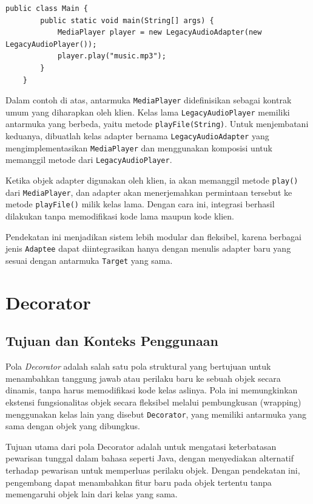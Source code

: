 \begin{lstlisting}[style=JavaStyle, caption={Client: Menggunakan Adapter}, label={lst:adapter-client}]
	public class Main {
		public static void main(String[] args) {
			MediaPlayer player = new LegacyAudioAdapter(new LegacyAudioPlayer());
			player.play("music.mp3");
		}
	}
\end{lstlisting}

Dalam contoh di atas, antarmuka \texttt{MediaPlayer} didefinisikan sebagai kontrak umum yang diharapkan oleh klien. Kelas lama \texttt{LegacyAudioPlayer} memiliki antarmuka yang berbeda, yaitu metode \texttt{playFile(String)}. Untuk menjembatani keduanya, dibuatlah kelas adapter bernama \texttt{LegacyAudioAdapter} yang mengimplementasikan \texttt{MediaPlayer} dan menggunakan komposisi untuk memanggil metode dari \texttt{LegacyAudioPlayer}.

Ketika objek adapter digunakan oleh klien, ia akan memanggil metode \texttt{play()} dari \texttt{MediaPlayer}, dan adapter akan menerjemahkan permintaan tersebut ke metode \texttt{playFile()} milik kelas lama. Dengan cara ini, integrasi berhasil dilakukan tanpa memodifikasi kode lama maupun kode klien.

Pendekatan ini menjadikan sistem lebih modular dan fleksibel, karena berbagai jenis \texttt{Adaptee} dapat diintegrasikan hanya dengan menulis adapter baru yang sesuai dengan antarmuka \texttt{Target} yang sama.



\section{Decorator}

\subsection{Tujuan dan Konteks Penggunaan}

Pola \textit{Decorator} adalah salah satu pola struktural yang bertujuan untuk menambahkan tanggung jawab atau perilaku baru ke sebuah objek secara dinamis, tanpa harus memodifikasi kode kelas aslinya. Pola ini memungkinkan ekstensi fungsionalitas objek secara fleksibel melalui pembungkusan (wrapping) menggunakan kelas lain yang disebut \texttt{Decorator}, yang memiliki antarmuka yang sama dengan objek yang dibungkus.

Tujuan utama dari pola Decorator adalah untuk mengatasi keterbatasan pewarisan tunggal dalam bahasa seperti Java, dengan menyediakan alternatif terhadap pewarisan untuk memperluas perilaku objek. Dengan pendekatan ini, pengembang dapat menambahkan fitur baru pada objek tertentu tanpa memengaruhi objek lain dari kelas yang sama.

